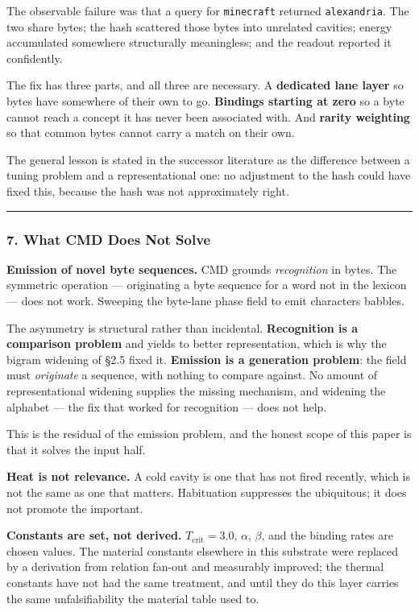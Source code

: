 \documentclass[
  11pt,
  a4paper,
]{article}
\begin{document}
The observable failure was that a query for \texttt{minecraft} returned
\texttt{alexandria}. The two share bytes; the hash scattered those bytes
into unrelated cavities; energy accumulated somewhere structurally
meaningless; and the readout reported it confidently.

The fix has three parts, and all three are necessary. A
\textbf{dedicated lane layer} so bytes have somewhere of their own to
go. \textbf{Bindings starting at zero} so a byte cannot reach a concept
it has never been associated with. And \textbf{rarity weighting} so that
common bytes cannot carry a match on their own.

The general lesson is stated in the successor literature as the
difference between a tuning problem and a representational one: no
adjustment to the hash could have fixed this, because the hash was not
approximately right.

\begin{center}\rule{0.5\linewidth}{0.5pt}\end{center}

\subsubsection{7. What CMD Does Not
Solve}\label{what-cmd-does-not-solve}

\textbf{Emission of novel byte sequences.} CMD grounds
\emph{recognition} in bytes. The symmetric operation --- originating a
byte sequence for a word not in the lexicon --- does not work. Sweeping
the byte-lane phase field to emit characters babbles.

The asymmetry is structural rather than incidental. \textbf{Recognition
is a comparison problem} and yields to better representation, which is
why the bigram widening of §2.5 fixed it. \textbf{Emission is a
generation problem}: the field must \emph{originate} a sequence, with
nothing to compare against. No amount of representational widening
supplies the missing mechanism, and widening the alphabet --- the fix
that worked for recognition --- does not help.

This is the residual of the emission problem, and the honest scope of
this paper is that it solves the input half.

\textbf{Heat is not relevance.} A cold cavity is one that has not fired
recently, which is not the same as one that matters. Habituation
suppresses the ubiquitous; it does not promote the important.

\textbf{Constants are set, not derived.} \(T_{\text{crit}} = 3.0\),
\(\alpha\), \(\beta\), and the binding rates are chosen values. The
material constants elsewhere in this substrate were replaced by a
derivation from relation fan-out and measurably improved; the thermal
constants have not had the same treatment, and until they do this layer
carries the same unfalsifiability the material table used to.
\end{document}
